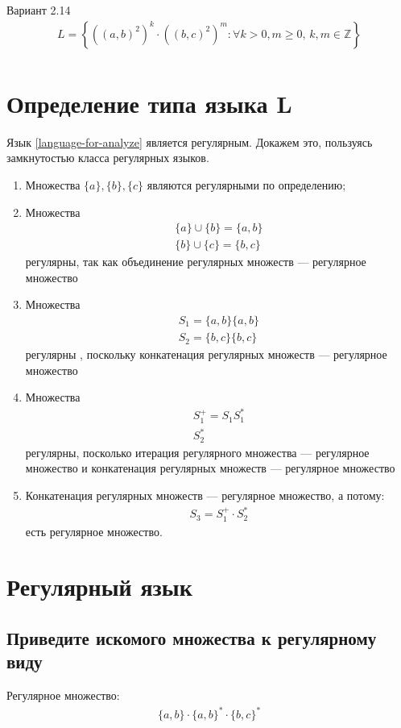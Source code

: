 Вариант 2.14
\begin{align}\label{language-for-analyze}
	L = \left\{ ((a,b)^2)^k \cdot ((b,c)^2)^m \colon \forall k > 0, m \geq 0,\, k,m \in \mathbb{Z} \right\} \\
\end{align}
\section{Определение типа языка L}
Язык \cref{language-for-analyze} является регулярным. Докажем это, пользуясь замкнутостью класса регулярных языков.
\begin{enumerate}
	\item Множества \(\{a\}, \{b\}, \{c\}\) являются регулярными по определению;
	\item Множества
	      \begin{align}
		      \{a\} \cup \{b\} =  \{a,b\} \\
		      \{b\} \cup \{c\} =  \{b,c\}
	      \end{align}
	      регулярны, так как объединение регулярных множеств --- регулярное множество
	\item Множества \begin{align}
		      S_1 = \{a, b\}\{a,b\} \\
		      S_2 = \{b, c\}\{b,c\}
	      \end{align}
	      регулярны , поскольку конкатенация регулярных множеств --- регулярное множество
	\item Множества
	      \begin{align}
		      S_1^+ = S_1 S_1^* \\
		      S_2^*
	      \end{align}
	      регулярны, посколько итерация регулярного множества --- регулярное множество и конкатенация регулярных множеств --- регулярное множество
	\item Конкатенация регулярных множеств --- регулярное множество, а потому:
	      \begin{align}
		      S_3 = S_1^+ \cdot S_2^*
	      \end{align}
	      есть регулярное множество.
\end{enumerate}
\section{Регулярный язык}
\subsection{Приведите искомого множества к регулярному виду}
Регулярное множество:
\begin{align}
	\{a, b\}\cdot\{a, b\}^*\cdot\{b, c\}^*
\end{align}
